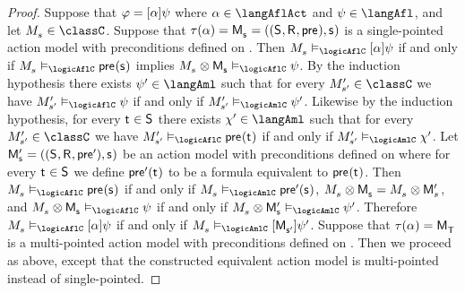 \begin{proof}
Suppose that $\varphi = {[ {\alpha} ]} \psi$ where $\alpha \in \langAflAct$ and $\psi \in \langAfl$, and let $\kPModel{\kStateS} \in \classC$.
Suppose that $\tau(\alpha) = \aPModelAndTuple{\aStateS}$ is a single-pointed action model with preconditions defined on \langAfl{}.
Then $\kPModel{\kStateS} \entails_\logicAflC \actionA{\alpha} \psi$ if and only if $\kPModel{\kStateS} \entails_\logicAflC \aPrecondition(\aStateS)$ implies $\kPModel{\kStateS} \exec \aPModel{\aStateS} \entails_\logicAflC \psi$.
By the induction hypothesis there exists $\psi' \in \langAml$ such that for every $\kPModelP{\kStateSP} \in \classC$ we have $\kPModelP{\kStateSP} \entails_\logicAflC \psi$ if and only if $\kPModelP{\kStateSP} \entails_\logicAmlC \psi'$.
Likewise by the induction hypothesis, for every $\aStateT \in \aStates$ there exists $\chi' \in \langAml$ such that for every $\kPModelP{\kStateSP} \in \classC$ we have $\kPModelP{\kStateSP} \entails_\logicAflC \aPrecondition(\aStateT)$ if and only if $\kPModelP{\kStateSP} \entails_\logicAmlC \chi'$.
Let $\aPModelP{\aStateS} = ((\aStates, \aAccessibility{}, \aPreconditionP), \aStateS)$ be an action model with preconditions defined on \langAml{} where for every $\aStateT \in \aStates$ we define $\aPreconditionP(\aStateT)$ to be a \langAml{} formula equivalent to $\aPrecondition(\aStateT)$.
Then $\kPModel{\kStateS} \entails_\logicAflC \aPrecondition(\aStateS)$ if and only if $\kPModel{\kStateS} \entails_\logicAmlC \aPreconditionP(\aStateS)$, $\kPModel{\kStateS} \exec \aPModel{\aStateS} = \kPModel{\kStateS} \exec \aPModelP{\kStateS}$, and $\kPModel{\kStateS} \exec \aPModel{\aStateS} \entails_\logicAflC \psi$ if and only if $\kPModel{\kStateS} \exec \aPModelP{\aStateS} \entails_\logicAmlC \psi'$.
Therefore $\kPModel{\kStateS} \entails_\logicAflC \actionA{\alpha} \psi$ if and only if $\kPModel{\kStateS} \entails_\logicAmlC \actionA{\aPModel{\aStateSP}} \psi'$.
Suppose that $\tau(\alpha) = \aPModel{\aStatesT}$ is a multi-pointed action model with preconditions defined on \langAfl{}.
Then we proceed as above, except that the constructed equivalent action model is multi-pointed instead of single-pointed.
\end{proof}

